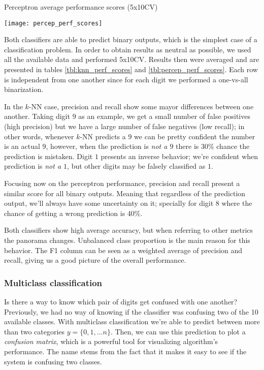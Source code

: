 \begin{table}[]
	\renewcommand{\arraystretch}{1.3}
	\caption{Perceptron average performance scores (5x10CV)}
	\label{tbl:percep_perf_scores}
	\centering
	\texttt{[image: percep\_perf\_scores]}
\end{table}

Both classifiers are able to predict binary outputs, which is the simplest case of a classification problem. In order to obtain results as neutral as possible, we used all the available data and performed 5x10CV. Results then were averaged and are presented in tables \ref{tbl:knn_perf_scores} and \ref{tbl:percep_perf_scores}. Each row is independent from one another since for each digit we performed a one-vs-all binarization. 

In the $k$-NN case, precision and recall show some mayor differences between one another. Taking digit $9$ as an example, we get a small number of false positives (high precision) but we have a large number of false negatives (low recall); in other words, whenever $k$-NN predicts a $9$ we can be pretty confident the number is an actual $9$, however, when the prediction is \textit{not a $9$} there is 30\% chance the prediction is mistaken. Digit $1$ presents an inverse behavior; we're confident when prediction is \textit{not a $1$}, but other digits may be falsely classified as $1$.

Focusing now on the perceptron performance, precision and recall present a similar score for all binary outputs. Meaning that regardless of the prediction output, we'll always have some uncertainty on it; specially for digit $8$ where the chance of getting a wrong prediction is 40\%.

Both classifiers show high average accuracy, but when referring to other metrics the panorama changes. Unbalanced class proportion is the main reason for this behavior. The F1 column can be seen as a weighted average of precision and recall, giving us a good picture of the overall performance.\\

\subsubsection{Multiclass classification}
Is there a way to know which pair of digits get confused with one another? Previously, we had no way of knowing if the classifier was confusing two of the 10 available classes. With multiclass classification we're able to predict between more than two categories $y = \lbrace 0, 1, ... n \rbrace$. Then, we can use this prediction to plot a \textit{confusion matrix}, which is a powerful tool for visualizing algorithm's performance. The name stems from the fact that it makes it easy to see if the system is confusing two classes.

